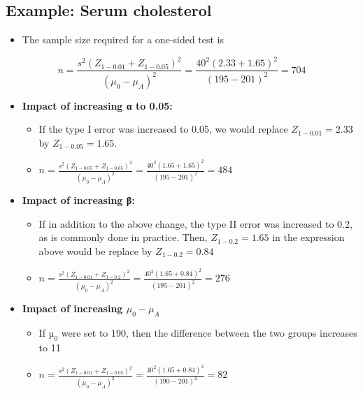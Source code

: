 \documentclass[
]{book}
\providecommand{\tightlist}{%
  \setlength{\itemsep}{0pt}\setlength{\parskip}{0pt}}
\begin{document}
\hypertarget{example-serum-cholesterol-1}{%
\subsection{Example: Serum cholesterol}\label{example-serum-cholesterol-1}}

\begin{itemize}
\tightlist
\item
  The sample size required for a one-sided test is
\end{itemize}

\[n = \frac{s^2(Z_{1-0.01}+Z_{1-0.05})^2}{(\mu_0-\mu_A)^2}=\frac{40^2(2.33+1.65)^2}{(195-201)^2}=704\]

\begin{itemize}
\tightlist
\item
  \textbf{Impact of increasing α to 0.05:}

  \begin{itemize}
  \tightlist
  \item
    If the type I error was increased to 0.05, we would replace \(Z_{1-0.01} = 2.33\) by \(Z_{1-0.05} = 1.65\).
  \item
    \(n = \frac{s^2(Z_{1-0.05}+Z_{1-0.05})^2}{(\mu_0-\mu_A)^2}=\frac{40^2(1.65+1.65)^2}{(195-201)^2}=484\)
  \end{itemize}
\item
  \textbf{Impact of increasing β:}

  \begin{itemize}
  \tightlist
  \item
    If in addition to the above change, the type II error was increased to 0.2, as is commonly done in practice. Then, \(Z_{1-0.2} = 1.65\) in the expression above would be replace by \(Z_{1-0.2} = 0.84\)
  \item
    \(n = \frac{s^2(Z_{1-0.01}+Z_{1-0.2})^2}{(\mu_0-\mu_A)^2}=\frac{40^2(1.65+0.84)^2}{(195-201)^2}=276\)
  \end{itemize}
\item
  \textbf{Impact of increasing \(\mu_0-\mu_A\)}

  \begin{itemize}
  \tightlist
  \item
    If \(µ_0\) were set to 190, then the difference between the two groups increases to 11
  \item
    \(n = \frac{s^2(Z_{1-0.01}+Z_{1-0.05})^2}{(\mu_0-\mu_A)^2}=\frac{40^2(1.65+0.84)^2}{(190-201)^2}=82\)
  \end{itemize}
\end{itemize}
\end{document}
